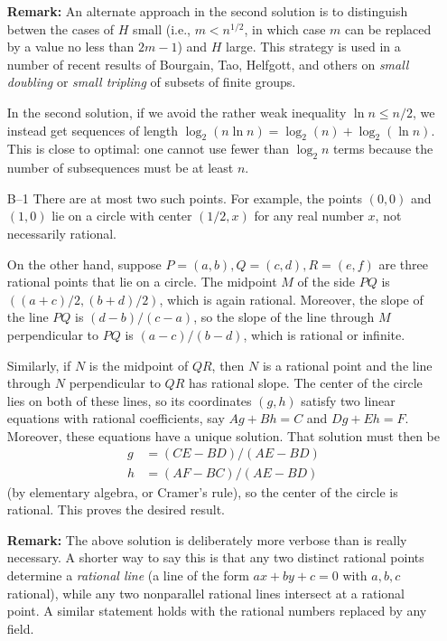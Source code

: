 \documentclass[amssymb,twocolumn,pra,10pt,aps]{revtex4-1}
\begin{document}
\begin{itemize}
\textbf{Remark:} An alternate approach in the second solution
is to distinguish betwen the cases of $H$ small (i.e.,
$m < n^{1/2}$, in which case $m$ can be replaced by a value
no less than $2m-1$) and $H$ large.
This strategy is used in a number of recent results
of Bourgain, Tao, Helfgott, and others on \emph{small doubling}
or \emph{small tripling}
of subsets of finite groups.

In the second solution, if we avoid the rather weak inequality
$\ln n \leq n/2$, we instead get sequences of length
$\log_2 (n \ln n) = \log_2(n) + \log_2 (\ln n)$.
This is close to optimal: one cannot use fewer than $\log_2 n$
terms because the number of subsequences must be at least $n$.

\item[B--1]
There are at most two such points. For example,
the points $(0,0)$ and $(1,0)$ lie on a circle with center
$(1/2, x)$ for any real number $x$, not necessarily rational.

On the other hand, suppose $P = (a,b), Q = (c,d), R = (e,f)$
are three rational points that lie
on a circle. The midpoint $M$ of the side $PQ$ is
$((a+c)/2, (b+d)/2)$, which is again rational. Moreover, the slope
of the line $PQ$ is $(d-b)/(c-a)$, so the slope of the line through
$M$ perpendicular to $PQ$ is $(a-c)/(b-d)$, which is rational or infinite.

Similarly, if $N$ is the midpoint of $QR$, then $N$ is a rational point
and the line through $N$ perpendicular to $QR$ has rational slope.
The center of the circle lies on both of these lines, so its
coordinates $(g,h)$ satisfy two linear equations with rational
coefficients, say $Ag + Bh = C$ and $Dg + Eh = F$. Moreover,
these equations have a unique solution. That solution must then be
\begin{align*}
g &= (CE - BD)/(AE - BD) \\
h &= (AF - BC)/(AE - BD)
\end{align*}
(by elementary algebra, or Cramer's rule),
so the center of the circle is rational. This proves the desired result.

\textbf{Remark:} The above solution is deliberately more verbose
than is really necessary. A shorter way to say this is that any two distinct
rational points determine a \emph{rational line}
(a line of the form $ax + by + c = 0$ with $a,b,c$ rational),
while any two nonparallel rational lines intersect at a rational point.
A similar statement holds with the rational numbers replaced by any
field.


\end{itemize}
\end{document}
